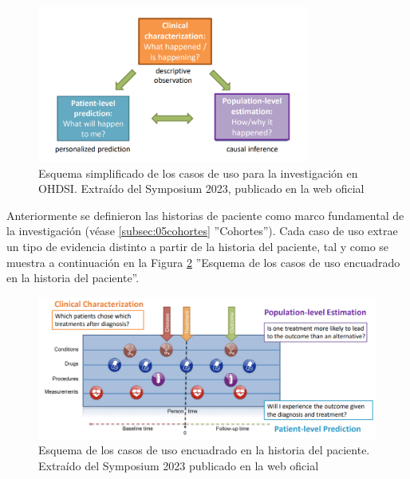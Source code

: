 \begin{figure}[H]
\centering
\includegraphics[width=0.80\textwidth]{figures/useCases.png}
     \caption{Esquema simplificado de los casos de uso para la investigación en OHDSI. Extraído del Symposium 2023, publicado en la web oficial \cite{OHDSIwebsite}}
    \label{fig:useCases}
\end{figure}


Anteriormente se definieron las historias de paciente como marco fundamental de la investigación (véase \ref{subsec:05cohortes} ''Cohortes''). Cada caso de uso extrae un tipo de evidencia distinto a partir de la historia del paciente, tal y como se muestra a continuación en la Figura \ref{fig:useCasesJourney} ''Esquema de los casos de uso encuadrado en la historia del paciente''.


\begin{figure}[H]
\centering
\includegraphics[width=1\textwidth]{figures/useCasesJourney.png}
     \caption{Esquema de los casos de uso encuadrado en la historia del paciente. Extraído del Symposium 2023 publicado en la web oficial \cite{OHDSIwebsite}}
    \label{fig:useCasesJourney}
\end{figure}

